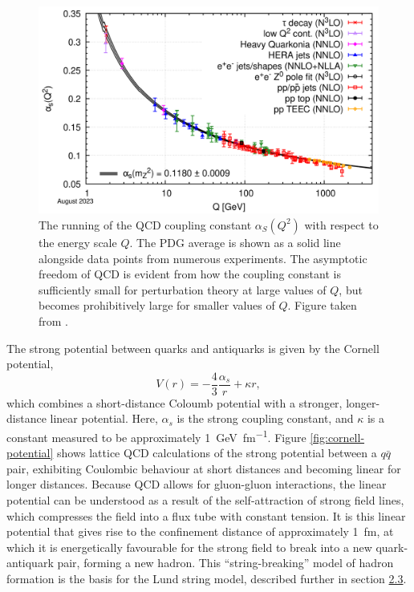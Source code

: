 \documentclass[12pt,a4paper]{report}
\begin{document}
\begin{figure}
  \centering
  \includegraphics[width=0.7\linewidth]{figures/running-coupling.png}
  \caption{The running of the QCD coupling constant $\alpha_S(Q^2)$ with respect to the energy scale $Q$. The PDG average is shown as a solid line alongside data points from numerous experiments. The asymptotic freedom of QCD is evident from how the coupling constant is sufficiently small for perturbation theory at large values of $Q$, but becomes prohibitively large for smaller values of $Q$. Figure taken from \cite{navas_review_2024}.}
  \label{fig:running-coupling}
\end{figure}

The strong potential between quarks and antiquarks is given by the Cornell potential,
\begin{equation}
  V(r) = -\frac{4}{3} \frac{\alpha_s}{r} + \kappa r,
\end{equation}
which combines a short-distance Coloumb potential with a stronger, longer-distance linear potential. Here, $\alpha_s$ is the strong coupling constant, and $\kappa$ is a constant measured to be approximately \qty{1}{\giga\electronvolt\per\femto\meter}. Figure \ref{fig:cornell-potential} shows lattice QCD calculations of the strong potential between a $q\bar{q}$ pair, exhibiting Coulombic behaviour at short distances and becoming linear for longer distances. Because QCD allows for gluon-gluon interactions, the linear potential can be understood as a result of the self-attraction of strong field lines, which compresses the field into a flux tube with constant tension. It is this linear potential that gives rise to the confinement distance of approximately \qty{1}{\femto\meter}, at which it is energetically favourable for the strong field to break into a new quark-antiquark pair, forming a new hadron. This ``string-breaking'' model of hadron formation is the basis for the Lund string model, described further in section \hyperref[sec:lsm]{2.3}.
\end{document}
